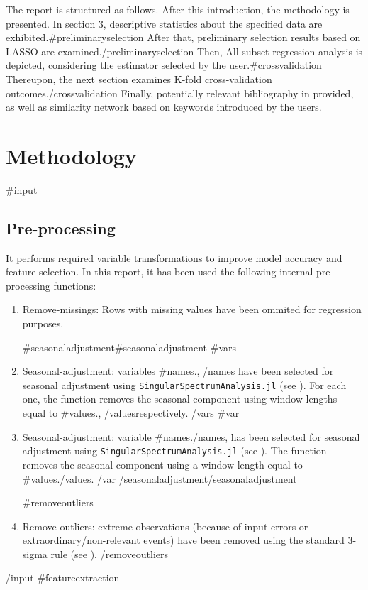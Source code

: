 \documentclass{article}
\begin{document}
The report is structured as follows. After this introduction, the methodology is presented. In section 3, descriptive statistics about the specified data are exhibited.{{#preliminaryselection}} After that, preliminary selection results based on LASSO are examined.{{/preliminaryselection}} Then, All-subset-regression analysis is depicted, considering the estimator selected by the user.{{#crossvalidation}} Thereupon, the next section examines K-fold cross-validation outcomes.{{/crossvalidation}} Finally, potentially relevant bibliography in provided, as well as similarity network based on keywords introduced by the users.

\section{Methodology}

{{#input}}
\subsection{Pre-processing}
It performs required variable transformations to improve model accuracy and feature selection. In this report, it has been used the following internal pre-processing functions:

\begin{enumerate}
  \item Remove-missings: Rows with missing values have been ommited for regression purposes.

  {{#seasonaladjustment}}{{#seasonaladjustment}}
    {{#vars}}
      \item Seasonal-adjustment: variables {{#names}}{{.}}, {{/names}} have been selected for seasonal adjustment using \verb|SingularSpectrumAnalysis.jl|  (see \cite{hassani2007}). For each one, the function removes the seasonal component using window lengths equal to {{#values}}{{.}}, {{/values}}respectively.
    {{/vars}}
    {{#var}}
      \item Seasonal-adjustment: variable {{#names}}{{.}}{{/names}}, has been selected for seasonal adjustment using \verb|SingularSpectrumAnalysis.jl|  (see \cite{hassani2007}). The function removes the seasonal component using a window length equal to {{#values}}{{.}}{{/values}}.
    {{/var}}
  {{/seasonaladjustment}}{{/seasonaladjustment}}

  {{#removeoutliers}} 
  \item Remove-outliers: extreme observations (because of input errors or extraordinary/non-relevant events) have been removed using the standard 3-sigma rule (see \cite{lehmann2013}).
  {{/removeoutliers}}
\end{enumerate}
{{/input}}
{{#featureextraction}}
\end{document}
